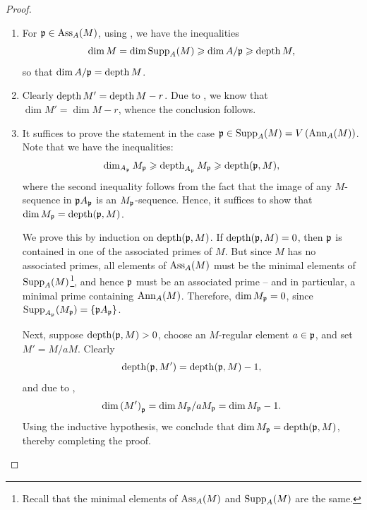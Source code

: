 \begin{proof}
\begin{enumerate}[label=(\arabic*)]
    \item For $\mathfrak{p}\in\operatorname{Ass}_A(M)$, using , we have the inequalities
    \begin{equation*}
        \dim M = \dim\operatorname{Supp}_A(M)\geqslant\dim A/\mathfrak{p}\geqslant\operatorname{depth} M,
    \end{equation*}
    so that $\dim A/\mathfrak{p} = \operatorname{depth} M$.
    \item Clearly $\operatorname{depth} M' = \operatorname{depth} M - r$. Due to , we know that $\dim M' = \dim M - r$, whence the conclusion follows.
    \item It suffices to prove the statement in the case $\mathfrak{p}\in\operatorname{Supp}_A(M) = V\left(\operatorname{Ann}_A(M)\right)$. Note that we have the inequalities: 
    \begin{equation*}
        \dim_{A_{\mathfrak{p}}} M_{\mathfrak{p}}\geqslant\operatorname{depth}_{A_{\mathfrak{p}}} M_{\mathfrak{p}}\geqslant\operatorname{depth}(\mathfrak{p}, M),
    \end{equation*}
    where the second inequality follows from the fact that the image of any $M$-sequence in $\mathfrak{p} A_{\mathfrak{p}}$ is an $M_{\mathfrak{p}}$-sequence. Hence, it suffices to show that $\dim M_{\mathfrak{p}} = \operatorname{depth}(\mathfrak{p}, M)$.

    We prove this by induction on $\operatorname{depth}(\mathfrak{p}, M)$. If $\operatorname{depth}(\mathfrak{p}, M) = 0$, then $\mathfrak{p}$ is contained in one of the associated primes of $M$. But since $M$ has no associated primes, all elements of $\operatorname{Ass}_A(M)$ must be the minimal elements of $\operatorname{Supp}_A(M)$\footnote{Recall that the minimal elements of $\operatorname{Ass}_A(M)$ and $\operatorname{Supp}_A(M)$ are the same.}, and hence $\mathfrak{p}$ must be an associated prime -- and in particular, a minimal prime containing $\operatorname{Ann}_A(M)$. Therefore, $\dim M_{\mathfrak{p}} = 0$, since $\operatorname{Supp}_{A_{\mathfrak{p}}}(M_{\mathfrak{p}}) = \{\mathfrak{p} A_{\mathfrak{p}}\}$.

    Next, suppose $\operatorname{depth}(\mathfrak{p}, M) > 0$, choose an $M$-regular element $a\in\mathfrak{p}$, and set $M' = M/aM$. Clearly 
    \begin{equation*}
        \operatorname{depth}(\mathfrak{p}, M') = \operatorname{depth}(\mathfrak{p}, M) - 1,
    \end{equation*}
    and due to , 
    \begin{equation*}
        \dim \left(M'\right)_{\mathfrak{p}} = \dim M_{\mathfrak{p}}/aM_{\mathfrak{p}} = \dim M_{\mathfrak{p}} - 1.
    \end{equation*}
    Using the inductive hypothesis, we conclude that $\dim M_{\mathfrak{p}} = \operatorname{depth}(\mathfrak{p}, M)$, thereby completing the proof. \qedhere
\end{enumerate}
\end{proof}

